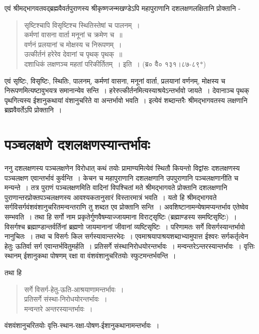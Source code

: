 एवं श्रीमद्भागवतवद्ब्रह्मवैवर्तपुराणस्य श्रीकृष्णजन्मखण्डेऽपि महापुराणानि दशलक्षणलक्षितानि प्रोक्तानि -
\begin{verse}
सृष्टिश्चापि विसृष्टिश्च स्थितिस्तेषां च पालनम्~।\\
कर्मणां वासना वार्ता मनूनां च क्रमेण च~॥\\
वर्णनं प्रलयानां च मोक्षस्य च निरूपणम्~।\\
उत्कीर्तनं हरेरेव देवानां च पृथक् पृथक्~॥\\
दशाधिकं लक्षणञ्च महतां परिकीर्तितम्~। इति~। (ब्र० वै० १३१।८७-८९$*$)
\end{verse}
एवं सृष्टिः, विसृष्टिः, स्थितिः, पालनम्, कर्मणां वासना, मनूनां वार्ता, प्रलयानां वर्णनम्, मोक्षस्य च निरूपणमित्यष्टावुभयत्र समानान्येव सन्ति~। हरेरुत्कीर्तनमित्यस्याश्रयेऽन्तर्भावो जायते~। देवानाञ्च पृथक् पृथगित्यस्य ईशानुकथायां वंशानुचरिते वा अन्तर्भावो भवति~। इत्येवं शब्दान्तरैः श्रीमद्भागवतस्य लक्षणानि ब्रह्मवैवर्तेऽपि प्रोक्तानि~।

\section*{पञ्चलक्षणे दशलक्षणस्यान्तर्भावः}

ननु दशलक्षणस्य पञ्चलक्षणेन विरोधात् कथं तयोः प्रामाण्यमित्येवं स्थितौ कियन्तो विद्वांसः दशलक्षणस्य पञ्चलक्षण एवान्तर्भावं कुर्वन्ति~। केचन च महापुराणानि दशलक्षणानि उपपुराणानि पञ्चलक्षणानीति च मन्यन्ते~। तत्र पुराणं पञ्चलक्षणमिति वादिनां विपश्चितां मते श्रीमद्भागवते प्रोक्तानि दशलक्षणानि पुराणान्तरप्रोक्तपञ्चलक्षणस्य आवश्यकतानुसारं विस्तारमात्रं भवति~। यतो हि श्रीमद्भागवते सर्गविसर्गवंशवंशानुचरितमन्वन्तराणि तु शब्दत एव प्रोक्तानि सन्ति~। अवशिष्टानामन्येषामप्यन्तर्भाव एतेष्वेव सम्भवति~। तथा हि सर्गो नाम प्रकृतेर्गुणवैषम्याज्जायमाना विराट्सृष्टिः (ब्रह्माण्डस्य समष्टिसृष्टिः)~। विसर्गश्च ब्रह्माण्डान्तर्वर्तिनां ब्रह्मणो जायमानानां जीवानां व्यष्टिसृष्टिः~। परिणामतः सर्गे विसर्गस्यान्तर्भावो नानुचितः~। तथा च विसर्गः किल सर्गस्यावान्तरभेदः~। एवमाश्रयापाश्रयशब्दाभ्यामुपात्त ईश्वरः सर्गकर्तृत्वेन हेतुः ऊतिर्वा सर्ग एवान्तर्भवितुमर्हति~। प्रतिसर्गे संस्थानिरोधयोरन्तर्भावः~। मन्वन्तरेऽन्तरस्यान्तर्भावः~। वृत्तिः स्थानम् ईशानुकथा पोषणम् रक्षा वा वंशवंशानुचरितयोः स्फुटमन्तर्भवन्ति~।

तथा हि \
\begin{verse}
सर्गे विसर्ग-हेतु-ऊति-आश्रयाणामन्तर्भावः~।\\
प्रतिसर्गे संस्था-निरोधयोरन्तर्भावः~।\\
मन्वन्तरे अन्तरस्यान्तर्भावः~।
\end{verse}
वंशवंशानुचरितयोः वृत्ति-स्थान-रक्षा-पोषण-ईशानुकथानामन्तर्भावः~।


